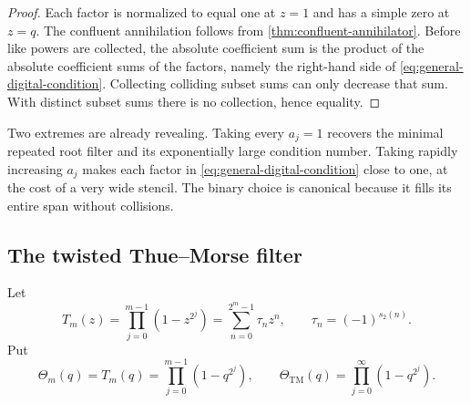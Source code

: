 \documentclass[11pt,oneside]{article}
\numberwithin{equation}{section}
\theoremstyle{definition}
\theoremstyle{remark}
\newcommand{\wt}{s_2}
\newcommand{\ThetaTM}{\Theta_{\!\mathrm{TM}}}
\begin{document}
\begin{proof}
Each factor is normalized to equal one at $z=1$ and has a simple zero at $z=q$.
The confluent annihilation follows from \cref{thm:confluent-annihilator}.  Before like
powers are collected, the absolute coefficient sum is the product of the absolute
coefficient sums of the factors, namely the right-hand side of
\eqref{eq:general-digital-condition}.  Collecting colliding subset sums can only decrease
that sum.  With distinct subset sums there is no collection, hence equality.
\end{proof}

Two extremes are already revealing.  Taking every $a_j=1$ recovers the minimal repeated
root filter and its exponentially large condition number.  Taking rapidly increasing
$a_j$ makes each factor in \eqref{eq:general-digital-condition} close to one, at the cost
of a very wide stencil.  The binary choice is canonical because it fills its entire span
without collisions.

\subsection{The twisted Thue--Morse filter}

Let
\begin{equation}
 T_m(z)=\prod_{j=0}^{m-1}(1-z^{2^j})
 =\sum_{n=0}^{2^m-1}\tau_nz^n,
 \qquad \tau_n=(-1)^{\wt(n)}.
 \label{eq:tm-polynomial}
\end{equation}
Put
\begin{equation}
 \Theta_m(q)=T_m(q)=\prod_{j=0}^{m-1}(1-q^{2^j}),
 \qquad
 \ThetaTM(q)=\prod_{j=0}^{\infty}(1-q^{2^j}).
 \label{eq:tm-theta}
\end{equation}
\end{document}

